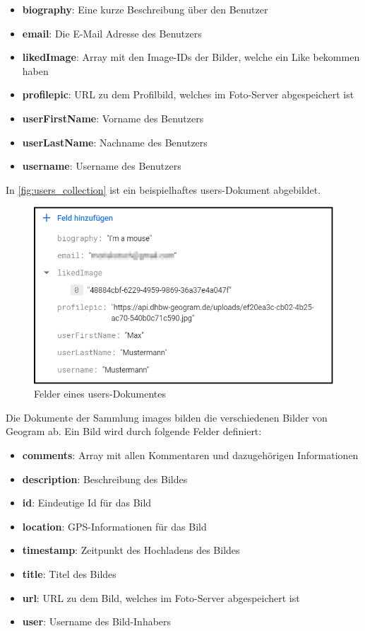 \begin{itemize}
    \item \textbf{biography}: Eine kurze Beschreibung über den Benutzer
    \item \textbf{email}: Die E-Mail Adresse des Benutzers
    \item \textbf{likedImage}: Array mit den Image-IDs der Bilder, welche ein Like bekommen haben
    \item \textbf{profilepic}: URL zu dem Profilbild, welches im Foto-Server abgespeichert ist
    \item \textbf{userFirstName}: Vorname des Benutzers
    \item \textbf{userLastName}: Nachname des Benutzers
    \item \textbf{username}: Username des Benutzers
\end{itemize}

In \autoref{fig:users_collection} ist ein beispielhaftes users-Dokument abgebildet.

\begin{figure}[H]
    \centering
    \includegraphics[width=.7\linewidth]{images/collection_users.png}
    \caption{Felder eines \glqq users\grqq{}-Dokumentes}
    \label{fig:users_collection}
\end{figure}

Die Dokumente der Sammlung \glqq images\grqq{} bilden die verschiedenen Bilder von Geogram ab. Ein Bild wird durch folgende Felder definiert:

\begin{itemize}
    \item \textbf{comments}: Array mit allen Kommentaren und dazugehörigen Informationen
    \item \textbf{description}: Beschreibung des Bildes
    \item \textbf{id}: Eindeutige Id für das Bild
    \item \textbf{location}: GPS-Informationen für das Bild
    \item \textbf{timestamp}: Zeitpunkt des Hochladens des Bildes
    \item \textbf{title}: Titel des Bildes
    \item \textbf{url}: URL zu dem Bild, welches im Foto-Server abgespeichert ist
    \item \textbf{user}: Username des Bild-Inhabers
\end{itemize}

